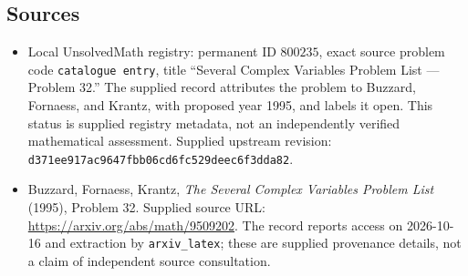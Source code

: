 \documentclass[11pt]{article}
\begin{document}
\subsection{Sources}
\begin{itemize}
\item Local UnsolvedMath registry: permanent ID $800235$, exact source problem code \texttt{catalogue entry}, title ``Several Complex Variables Problem List --- Problem 32.'' The supplied record attributes the problem to Buzzard, Fornaess, and Krantz, with proposed year 1995, and labels it open. This status is supplied registry metadata, not an independently verified mathematical assessment. Supplied upstream revision: \texttt{d371ee917ac9647fbb06cd6fc529deec6f3dda82}.
\item Buzzard, Fornaess, Krantz, \emph{The Several Complex Variables Problem List} (1995), Problem 32. Supplied source URL: \url{https://arxiv.org/abs/math/9509202}. The record reports access on 2026-10-16 and extraction by \texttt{arxiv\_latex}; these are supplied provenance details, not a claim of independent source consultation.
\end{itemize}
\end{document}
